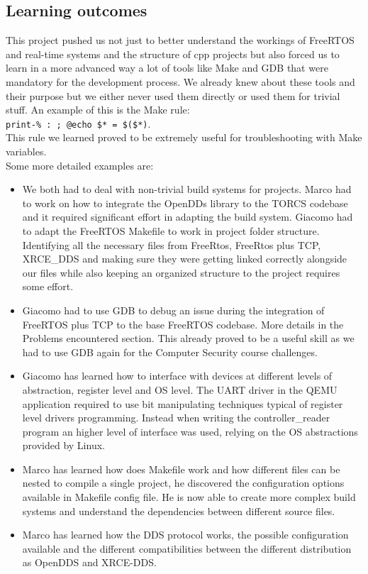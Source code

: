 \documentclass[10pt,a4]{article}
\begin{document}
\subsection{Learning outcomes}

This project pushed us not just to better understand the workings of FreeRTOS and real-time systems and the structure of cpp projects
but also forced us to learn in a more advanced way a lot of tools like Make and GDB that were mandatory for the development process.
We already knew about these tools and their purpose but we either never used them directly or used them for trivial stuff.
An example of this is the Make rule:\\\texttt{print-\% : ; @echo \$* = \$(\$*)}. \\This rule we learned proved to be extremely useful
for troubleshooting with Make variables.
\\\newline
Some more detailed examples are:

\begin{itemize}
  \item We both had to deal with non-trivial build systems for projects. Marco had to work on how to integrate the OpenDDs library to the
        TORCS codebase and it required significant effort in adapting the build system. Giacomo had to adapt the FreeRTOS Makefile to
        work in project folder structure. Identifying all the necessary files from FreeRtos, FreeRtos plus TCP, XRCE\_DDS and making sure they were getting
        linked correctly alongside our files while also keeping an organized structure to the project requires some effort.
  \item Giacomo had to use GDB to debug an issue during the integration of FreeRTOS plus TCP to the base FreeRTOS codebase.
        More details in the Problems encountered section. This already proved to be a useful skill as we had to use GDB again for the Computer Security course challenges.
  \item Giacomo has learned how to interface with devices at different levels of abstraction, register level and OS level.
        The UART driver in the QEMU application required to use bit manipulating techniques typical of register level drivers programming.
        Instead when writing the controller\_reader program an higher level of interface was used, relying on the OS abstractions provided by Linux.
  \item Marco has learned how does Makefile work and how different files can be nested to compile a single project, he discovered the configuration options available in Makefile config file.
        He is now able to create more complex build systems and understand the dependencies between different source files.
  \item Marco has learned how the DDS protocol works, the possible configuration available and the different compatibilities between the different distribution as OpenDDS and XRCE-DDS.

\end{itemize}
\end{document}

